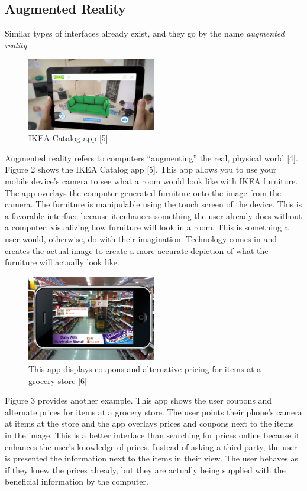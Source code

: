 \documentclass[a4paper,12pt]{article}
\begin{document}
\subsection{Augmented Reality}


Similar types of interfaces already exist, and they go by the name \emph{augmented reality}. 
\begin{figure}
\centering
\includegraphics[width=0.5\textwidth]{ikea}
\caption{IKEA Catalog app [5]}
\end{figure}


Augmented reality refers to computers ``augmenting'' the real, physical world [4]. Figure 2 shows the IKEA Catalog app [5]. This app allows you to use your mobile device's camera to see what a room would look like with IKEA furniture. The app overlays the computer-generated furniture onto the image from the camera. The furniture is manipulable using the touch screen of the device. This is a favorable interface because it enhances something the user already does without a computer: visualizing how furniture will look in a room. This is something a user would, otherwise, do with their imagination. Technology comes in and creates the actual image to create a more accurate depiction of what the furniture will actually look like.

\begin{figure}
\centering
\includegraphics[width=0.5\textwidth]{coupons}
\caption{This app displays coupons and alternative pricing for items at a grocery store [6]}
\end{figure}

Figure 3 provides another example. This app shows the user coupons and alternate prices for items at a grocery store. The user points their phone's camera at items at the store and the app overlays prices and coupons next to the items in the image. This is a better interface than searching for prices online because it enhances the user's knowledge of prices. Instead of asking a third party, the user is presented the information next to the items in their view. The user behaves as if they knew the prices already, but they are actually being supplied with the beneficial information by the computer.
\end{document}
